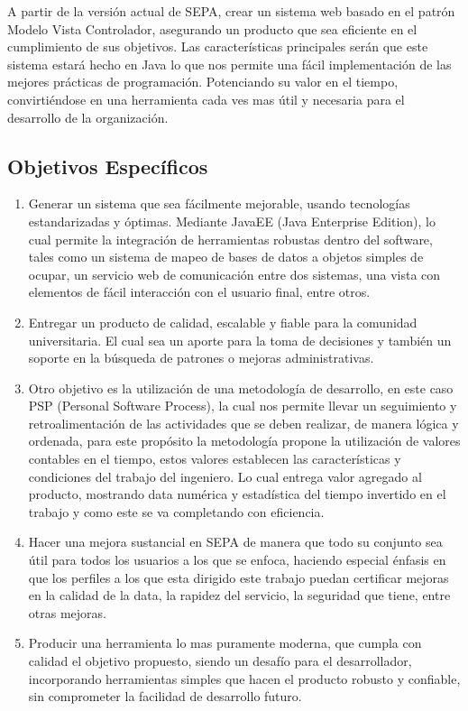 \documentclass[a4paper,12pt,openany,oneside]{book}
\begin{document}
A partir de la versión actual de SEPA, crear un sistema web basado en el patrón Modelo Vista Controlador, asegurando un producto que sea eficiente en el cumplimiento de sus objetivos. Las características principales serán que este sistema estará hecho en Java lo que nos permite una fácil implementación de las mejores prácticas de programación. Potenciando su valor en el tiempo, convirtiéndose en una herramienta cada ves mas útil y necesaria para el desarrollo de la organización.

\subsection{Objetivos Específicos}
\begin{enumerate}
	\item Generar un sistema que sea fácilmente mejorable, usando tecnologías estandarizadas y óptimas. Mediante JavaEE (Java Enterprise Edition), lo cual permite la integración de herramientas robustas dentro del software, tales como un sistema de mapeo de bases de datos a objetos simples de ocupar, un servicio web de comunicación entre dos sistemas, una vista con elementos de fácil interacción con el usuario final, entre otros.
	\item Entregar un producto de calidad, escalable y fiable para la comunidad universitaria. El cual sea un aporte para la toma de decisiones y también un soporte en la búsqueda de patrones o mejoras administrativas.
	\item Otro objetivo es la utilización de una metodología de desarrollo, en este caso PSP (Personal Software Process), la cual nos permite llevar un seguimiento y retroalimentación de las actividades que se deben realizar, de manera lógica y ordenada, para este propósito la metodología propone la utilización de valores contables en el tiempo, estos valores establecen las características y condiciones del trabajo del ingeniero. Lo cual entrega valor agregado al producto, mostrando data numérica y estadística del tiempo invertido en el trabajo y como este se va completando con eficiencia.
	\item Hacer una mejora sustancial en SEPA de manera que todo su conjunto sea útil para todos los usuarios a los que se enfoca, haciendo especial énfasis en que los perfiles a los que esta dirigido este trabajo puedan certificar mejoras en la calidad de la data, la rapidez del servicio, la seguridad que tiene, entre otras mejoras.  
	\item Producir una herramienta lo mas puramente moderna, que cumpla con calidad el objetivo propuesto, siendo un desafío para el desarrollador, incorporando herramientas simples que hacen el producto robusto y confiable, sin comprometer la facilidad de desarrollo futuro.
\end{enumerate}
\end{document}
